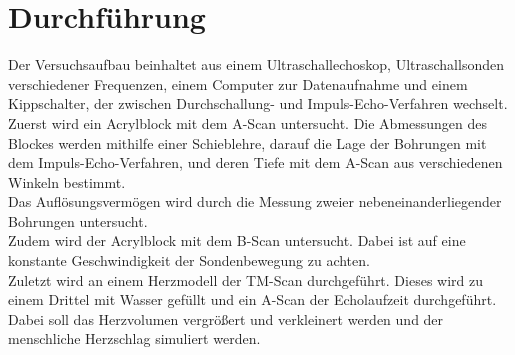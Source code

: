 \section{Durchführung}
\label{sec:Durchführung}

Der Versuchsaufbau beinhaltet aus einem Ultraschallechoskop,
Ultraschallsonden verschiedener Frequenzen, einem Computer
zur Datenaufnahme und einem Kippschalter, der zwischen
Durchschallung- und Impuls-Echo-Verfahren wechselt. \\

Zuerst wird ein Acrylblock mit dem A-Scan untersucht.
Die Abmessungen des Blockes werden mithilfe einer 
Schieblehre, darauf die Lage der Bohrungen mit dem
Impuls-Echo-Verfahren, und deren Tiefe mit dem A-Scan
aus verschiedenen Winkeln bestimmt. \\

Das Auflösungsvermögen wird durch die Messung zweier
nebeneinanderliegender Bohrungen untersucht.\\

Zudem wird der Acrylblock mit dem B-Scan untersucht. Dabei ist
auf eine konstante Geschwindigkeit der Sondenbewegung zu achten.\\

Zuletzt wird an einem Herzmodell der TM-Scan durchgeführt.
Dieses wird zu einem Drittel mit Wasser gefüllt und ein
A-Scan der Echolaufzeit durchgeführt.
Dabei soll das Herzvolumen vergrößert und verkleinert werden
und der menschliche Herzschlag simuliert werden.

